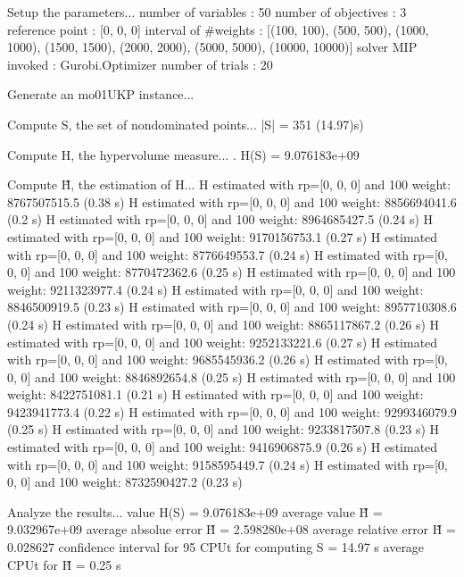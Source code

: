 Setup the parameters...
  number of variables  : 50
  number of objectives : 3
  reference point      : [0, 0, 0]
  interval of #weights : [(100, 100), (500, 500), (1000, 1000), (1500, 1500), (2000, 2000), (5000, 5000), (10000, 10000)]
  solver MIP invoked   : Gurobi.Optimizer
  number of trials     : 20

Generate an mo01UKP instance...

Compute S, the set of nondominated points...
  |S|  = 351 (14.97)s)

Compute H, the hypervolume measure...
. H(S) = 9.076183e+09

Compute H̃, the estimation of H...
  H estimated with rp=[0, 0, 0] and 100 weight:  8767507515.5  (0.38 s)
  H estimated with rp=[0, 0, 0] and 100 weight:  8856694041.6  (0.2 s)
  H estimated with rp=[0, 0, 0] and 100 weight:  8964685427.5  (0.24 s)
  H estimated with rp=[0, 0, 0] and 100 weight:  9170156753.1  (0.27 s)
  H estimated with rp=[0, 0, 0] and 100 weight:  8776649553.7  (0.24 s)
  H estimated with rp=[0, 0, 0] and 100 weight:  8770472362.6  (0.25 s)
  H estimated with rp=[0, 0, 0] and 100 weight:  9211323977.4  (0.24 s)
  H estimated with rp=[0, 0, 0] and 100 weight:  8846500919.5  (0.23 s)
  H estimated with rp=[0, 0, 0] and 100 weight:  8957710308.6  (0.24 s)
  H estimated with rp=[0, 0, 0] and 100 weight:  8865117867.2  (0.26 s)
  H estimated with rp=[0, 0, 0] and 100 weight:  9252133221.6  (0.27 s)
  H estimated with rp=[0, 0, 0] and 100 weight:  9685545936.2  (0.26 s)
  H estimated with rp=[0, 0, 0] and 100 weight:  8846892654.8  (0.25 s)
  H estimated with rp=[0, 0, 0] and 100 weight:  8422751081.1  (0.21 s)
  H estimated with rp=[0, 0, 0] and 100 weight:  9423941773.4  (0.22 s)
  H estimated with rp=[0, 0, 0] and 100 weight:  9299346079.9  (0.25 s)
  H estimated with rp=[0, 0, 0] and 100 weight:  9233817507.8  (0.23 s)
  H estimated with rp=[0, 0, 0] and 100 weight:  9416906875.9  (0.26 s)
  H estimated with rp=[0, 0, 0] and 100 weight:  9158595449.7  (0.24 s)
  H estimated with rp=[0, 0, 0] and 100 weight:  8732590427.2  (0.23 s)

Analyze the results...
  value H(S)                  = 9.076183e+09 
  average value H̃             = 9.032967e+09 
  average absolue error H̃     = 2.598280e+08 
  average relative error H̃    = 0.028627 
  confidence interval for 95%
  CPUt for computing S         = 14.97 s
  average CPUt for H̃           = 0.25 s

